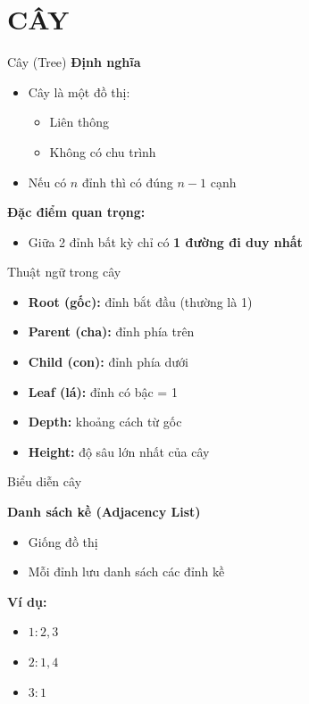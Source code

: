 \section{CÂY}
\begin{frame}{Cây (Tree)}
\textbf{Định nghĩa}

\vspace{0.4cm}

\begin{itemize}
\item Cây là một đồ thị:
\begin{itemize}
\item Liên thông
\item Không có chu trình
\end{itemize}

\vspace{0.3cm}

\item Nếu có $n$ đỉnh thì có đúng $n-1$ cạnh
\end{itemize}

\vspace{0.4cm}

\textbf{Đặc điểm quan trọng:}
\begin{itemize}
\item Giữa 2 đỉnh bất kỳ chỉ có \textbf{1 đường đi duy nhất}
\end{itemize}

\end{frame}
\begin{frame}{Thuật ngữ trong cây}

\begin{itemize}
\item \textbf{Root (gốc):} đỉnh bắt đầu (thường là 1)
\item \textbf{Parent (cha):} đỉnh phía trên
\item \textbf{Child (con):} đỉnh phía dưới
\item \textbf{Leaf (lá):} đỉnh có bậc = 1
\item \textbf{Depth:} khoảng cách từ gốc
\item \textbf{Height:} độ sâu lớn nhất của cây
\end{itemize}

\end{frame}
\begin{frame}{Biểu diễn cây}

\textbf{Danh sách kề (Adjacency List)}

\vspace{0.4cm}

\begin{itemize}
\item Giống đồ thị
\item Mỗi đỉnh lưu danh sách các đỉnh kề
\end{itemize}

\vspace{0.4cm}

\textbf{Ví dụ:}
\begin{itemize}
\item $1: 2, 3$
\item $2: 1, 4$
\item $3: 1$
\end{itemize}

\end{frame}
